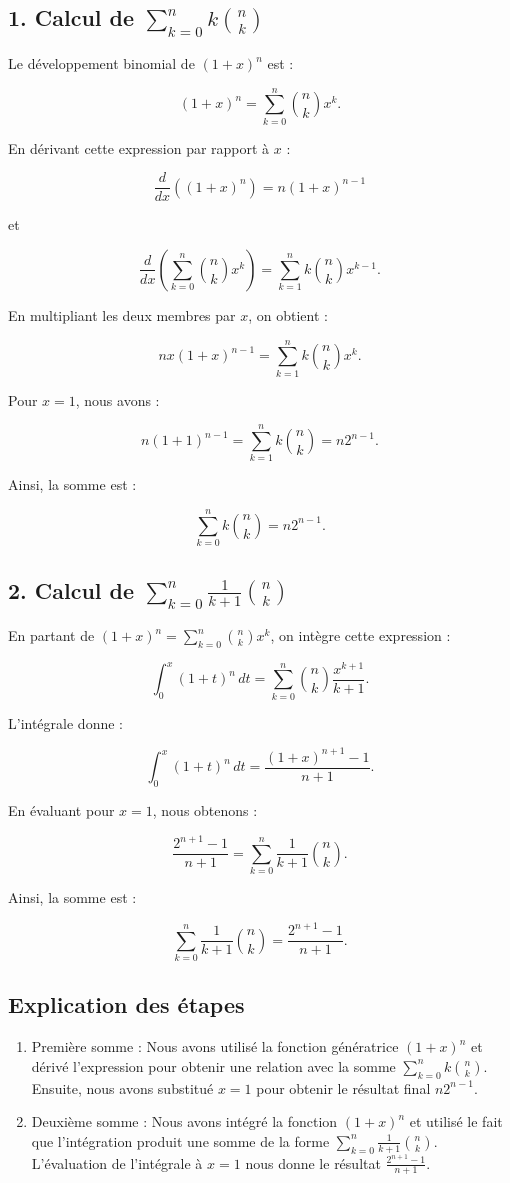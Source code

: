 \documentclass[a4paper,oneside,12pt]{amsbook}
\theoremstyle{definition}
\theoremstyle{remark}
\begin{document}
\subsection*{1. Calcul de $\sum_{k=0}^n k \binom{n}{k}$}

Le développement binomial de $(1 + x)^n$ est :

\[
(1 + x)^n = \sum_{k=0}^{n} \binom{n}{k} x^k.
\]

En dérivant cette expression par rapport à $x$ :

\[
\frac{d}{dx}\left( (1 + x)^n \right) = n(1 + x)^{n-1}
\]

et

\[
\frac{d}{dx}\left( \sum_{k=0}^{n} \binom{n}{k} x^k \right) = \sum_{k=1}^{n} k \binom{n}{k} x^{k-1}.
\]

En multipliant les deux membres par $x$, on obtient :

\[
n x (1 + x)^{n-1} = \sum_{k=1}^{n} k \binom{n}{k} x^k.
\]

Pour $x = 1$, nous avons :

\[
n(1 + 1)^{n-1} = \sum_{k=1}^{n} k \binom{n}{k} = n 2^{n-1}.
\]

Ainsi, la somme est :

\[
\sum_{k=0}^n k \binom{n}{k} = n 2^{n-1}.
\]

\subsection*{2. Calcul de $\sum_{k=0}^n \frac{1}{k+1} \binom{n}{k}$}

En partant de $(1 + x)^n = \sum_{k=0}^{n} \binom{n}{k} x^k$, on intègre cette expression :

\[
\int_0^x (1 + t)^n \, dt = \sum_{k=0}^{n} \binom{n}{k} \frac{x^{k+1}}{k+1}.
\]

L'intégrale donne :

\[
\int_0^x (1 + t)^n \, dt = \frac{(1 + x)^{n+1} - 1}{n+1}.
\]

En évaluant pour $x = 1$, nous obtenons :

\[
\frac{2^{n+1} - 1}{n+1} = \sum_{k=0}^{n} \frac{1}{k+1} \binom{n}{k}.
\]

Ainsi, la somme est :

\[
\sum_{k=0}^n \frac{1}{k+1} \binom{n}{k} = \frac{2^{n+1} - 1}{n+1}.
\]

\subsection*{Explication des étapes}
    \begin{enumerate}
        \item Première somme :	Nous avons utilisé la fonction génératrice $(1 + x)^n$ et dérivé l’expression pour obtenir une relation avec la somme $\sum_{k=0}^n k \binom{n}{k}$. Ensuite, nous avons substitué $x = 1$ pour obtenir le résultat final $n 2^{n-1}$.
        \item Deuxième somme :
		Nous avons intégré la fonction $(1 + x)^n$ et utilisé le fait que l’intégration produit une somme de la forme $\sum_{k=0}^n \frac{1}{k+1} \binom{n}{k}$. L’évaluation de l’intégrale à $x = 1$ nous donne le résultat $\frac{2^{n+1} - 1}{n+1}$.
    \end{enumerate}
\end{document}
